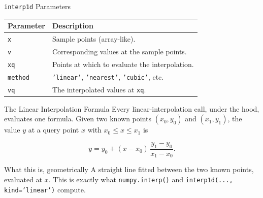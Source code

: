 \documentclass[9pt,aspectratio=169,xcolor=table]{beamer}
\begin{document}
\begin{frame}{\texttt{interp1d} Parameters}
    \leavevmode
    \small
    \begin{table}
    \centering
    \begin{tabular}{p{}p{}}
        \toprule
        \textbf{Parameter} & \textbf{Description} \\
        \midrule
        \texttt{x} & Sample points (array-like). \\
        \texttt{v} & Corresponding values at the sample points. \\
        \texttt{xq} & Points at which to evaluate the interpolation. \\
        \texttt{method} & \texttt{'linear'}, \texttt{'nearest'},
        \texttt{'cubic'}, etc. \\
        \texttt{vq} & The interpolated values at \texttt{xq}. \\
        \bottomrule
    \end{tabular}
    \end{table}
\end{frame}

\begin{frame}{The Linear Interpolation Formula}
    \leavevmode
    Every linear-interpolation call, under the hood, evaluates one
    formula. Given two known points $(x_0, y_0)$ and $(x_1, y_1)$, the
    value $y$ at a query point $x$ with $x_0 \le x \le x_1$ is

    \[
    y = y_0 + (x - x_0)\,\frac{y_1 - y_0}{x_1 - x_0}.
    \]

    \vspace{2mm}
    \begin{block}{What this is, geometrically}
        A straight line fitted \alert{between the two known points},
        evaluated at $x$. This is exactly what \texttt{numpy.interp()}
        and \texttt{interp1d(..., kind='linear')} compute.
    \end{block}
\end{frame}
\end{document}
